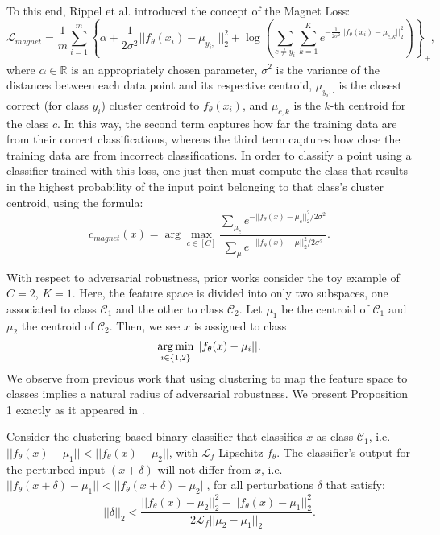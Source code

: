 To this end, Rippel et al. introduced the concept of the Magnet Loss:
\begin{equation}\label{eqn: magnet loss}
\mathcal{L}_{magnet} = \frac{1}{m}\sum_{i=1}^m \left\{\alpha+\frac{1}{2\sigma^2}||f_\theta(x_i)-\mu_{y_i,\cdot}||_2^2+\log\left(\sum_{c\neq y_i}\sum_{k=1}^K e^{-\frac{1}{2\sigma^2}||f_\theta(x_i) - \mu_{c,k}||_2^2}\right)\right\}_+,
\end{equation}
where $\alpha\in\mathbb{R}$ is an appropriately chosen parameter, $\sigma^2$ is the variance of the distances between each data point and its respective centroid, $\mu_{y_i, \cdot}$ is the closest correct (for class $y_i$) cluster centroid to $f_\theta(x_i)$, and $\mu_{c, k}$ is the $k$-th centroid for the class $c$. In this way, the second term captures how far the training data are from their correct classifications, whereas the third term captures how close the training data are from incorrect classifications. In order to classify a point using a classifier trained with this loss, one just then must compute the class that results in the highest probability of the input point belonging to that class's cluster centroid, using the formula:
$$
c_{magnet}(x) = \arg\max_{c\in[C]}\frac{\sum_{\mu_c} e^{-||f_\theta(x) - \mu_{c}||_2^2/2\sigma^2}}{\sum_{\mu}e^{-||f_\theta(x) - \mu||_2^2/2\sigma^2}}.
$$

With respect to adversarial robustness, prior works consider the toy example of $C = 2$, $K = 1$. Here, the feature space is divided into only two subspaces, one associated to class $\mathcal{C}_1$ and the other to class $\mathcal{C}_2$. Let $\mu_1$ be the centroid of $\mathcal{C}_1$ and $\mu_2$ the centroid of $\mathcal{C}_2$. Then, we see $x$ is assigned to class 
$$
\operatorname*{arg\,min}_{i\in\{1, 2\}} ||f_\theta(x) - \mu_i||.
$$
We observe from previous work that using clustering to map the feature space to classes implies a natural radius of adversarial robustness. We present Proposition 1 exactly as it appeared in \cite{Alfarra2020ClusTR}.

\begin{proposition}\label{prop: robust bound}
Consider the clustering-based binary classifier that classifies $x$ as class $\mathcal{C}_1$, i.e. $||f_\theta(x) - \mu_1|| < ||f_\theta(x) - \mu_2||$, with $\mathcal{L}_f$-Lipschitz $f_\theta$. The classifier's output for the perturbed input $(x+\delta)$ will not differ from $x$, i.e. $||f_\theta(x+\delta)-\mu_1|| < ||f_\theta(x+\delta) - \mu_2||$, for all perturbations $\delta$ that satisfy:
\begin{equation}\label{eqn: robust bound}
||\delta||_2 < \frac{||f_\theta(x)-\mu_2||_2^2 - ||f_\theta(x) - \mu_1||_2^2}{2\mathcal{L}_f||\mu_2-\mu_1||_2}.
\end{equation}
\end{proposition}

